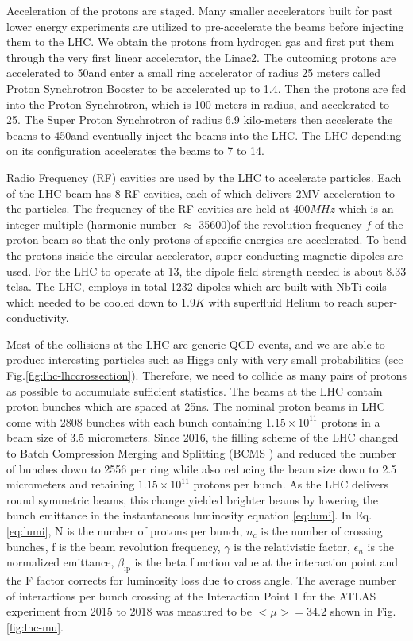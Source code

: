 Acceleration of the protons are staged. Many smaller accelerators built for past lower energy experiments are utilized to pre-accelerate the beams before injecting them to the LHC. We obtain the protons from hydrogen gas and first put them through the very first linear accelerator, the Linac2. The outcoming protons are accelerated to 50\mev and enter a small ring accelerator of radius 25 meters called Proton Synchrotron Booster to be accelerated up to 1.4\gev. Then the protons are fed into the Proton Synchrotron, which is 100 meters in radius, and accelerated to 25\gev. The Super Proton Synchrotron of radius 6.9 kilo-meters then accelerate the beams to 450\gev and eventually inject the beams into the LHC. The LHC depending on its configuration accelerates the beams to 7 to 14\tev.

Radio Frequency (RF) cavities are used by the LHC to accelerate particles. Each of the LHC beam has 8 RF cavities, each of which delivers 2MV acceleration to the particles. The frequency of the RF cavities are held at 400$MHz$ which is an integer multiple (harmonic number $\approx$ 35600)of the revolution frequency $f$ of the proton beam so that the only protons of specific energies are accelerated. To bend the protons inside the circular accelerator, super-conducting magnetic dipoles are used. For the LHC to operate at 13\tev, the dipole field strength needed is about 8.33 telsa. The LHC, employs in total 1232 dipoles which are built with NbTi coils which needed to be cooled down to 1.9$K$ with superfluid Helium to reach super-conductivity.

Most of the collisions at the LHC are generic QCD events, and we are able to produce interesting particles such as Higgs only with very small probabilities (see Fig.\ref{fig:lhc-lhccrossection}). Therefore, we need to collide as many pairs of protons as possible to accumulate sufficient statistics. The beams at the LHC contain proton bunches which are spaced at 25ns. The nominal proton beams in LHC come with 2808 bunches with each bunch containing $1.15\times 10^{11}$ protons in a beam size of 3.5 micrometers. Since 2016, the filling scheme of the LHC changed to Batch Compression Merging and Splitting (BCMS \cite{BCMS}) and reduced the number of bunches down to 2556 per ring while also reducing the beam size down to 2.5 micrometers and retaining $1.15\times 10^{11}$ protons per bunch. As the LHC delivers round symmetric beams, this change yielded brighter beams by lowering the bunch emittance in the instantaneous luminosity equation \ref{eq:lumi}. In Eq.\ref{eq:lumi}, N is the number of protons per bunch, $n_c$ is the number of crossing bunches, f is the beam revolution frequency, $\gamma$ is the relativistic factor, $\epsilon_n$ is the normalized emittance, $\beta_{\text{ip}}$ is the beta function value at the interaction point and the F factor corrects for luminosity loss due to cross angle. The average number of interactions per bunch crossing at the Interaction Point 1 for the ATLAS experiment from 2015 to 2018 was measured to be $<\mu>=34.2$ shown in Fig.\ref{fig:lhc-mu}. 


